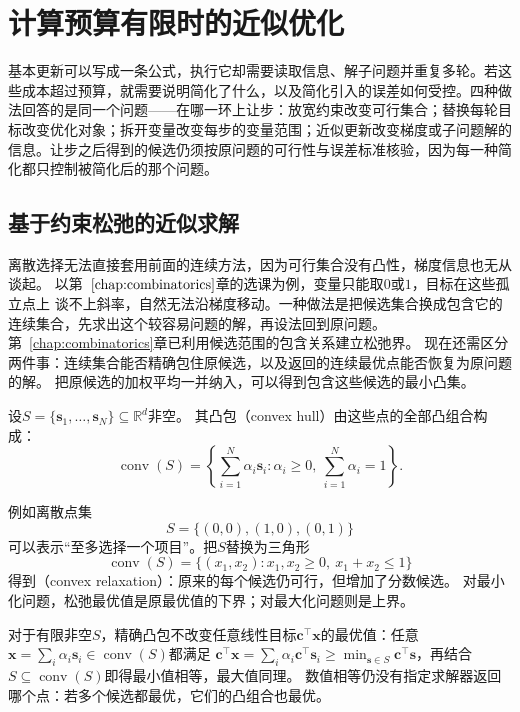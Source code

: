 \section{计算预算有限时的近似优化}
\label{sec:opt-approximate-optimization}

基本更新可以写成一条公式，执行它却需要读取信息、解子问题并重复多轮。若这些成本超过预算，就需要说明简化了什么，以及简化引入的误差如何受控。四种做法回答的是同一个问题——在哪一环上让步：放宽约束改变可行集合；替换每轮目标改变优化对象；拆开变量改变每步的变量范围；近似更新改变梯度或子问题解的信息。让步之后得到的候选仍须按原问题的可行性与误差标准核验，因为每一种简化都只控制被简化后的那个问题。

\subsection{基于约束松弛的近似求解}
\label{sec:opt-relaxations-certificates}

离散选择无法直接套用前面的连续方法，因为可行集合没有凸性，梯度信息也无从谈起。
以第~$\ref{chap:combinatorics}$章的选课为例，变量只能取$0$或$1$，目标在这些孤立点上
谈不上斜率，自然无法沿梯度移动。一种做法是把候选集合换成包含它的连续集合，先求出这个较容易问题的解，再设法回到原问题。
第~\ref{chap:combinatorics}章已利用候选范围的包含关系建立松弛界。
现在还需区分两件事：连续集合能否精确包住原候选，以及返回的连续最优点能否恢复为原问题的解。
把原候选的加权平均一并纳入，可以得到包含这些候选的最小凸集。

\begin{definition}[有限点集的凸包]
\label{def:opt-convex-hull}
设$S=\{\bm s_1,\ldots,\bm s_N\}\subseteq\mathbb R^d$非空。
其凸包（convex hull）由这些点的全部凸组合构成：
\[
  \operatorname{conv}(S)
  =\left\{\sum_{i=1}^N\alpha_i\bm s_i:
  \alpha_i\geq0,\ \sum_{i=1}^N\alpha_i=1\right\}.
\]
\end{definition}
例如离散点集
\[
  S=\{(0,0),(1,0),(0,1)\}
\]
可以表示“至多选择一个项目”。把$S$替换为三角形
\[
  \operatorname{conv}(S)
  =\{(x_1,x_2):x_1,x_2\geq0,\ x_1+x_2\leq1\}
\]
得到（convex relaxation）：原来的每个候选仍可行，但增加了分数候选。
对最小化问题，松弛最优值是原最优值的下界；对最大化问题则是上界。

对于有限非空$S$，精确凸包不改变任意线性目标$\bm{c}^{\top}\bm{x}$的最优值：任意
$\bm{x}=\sum_i\alpha_i\bm{s}_i\in\operatorname{conv}(S)$都满足
$\bm{c}^{\top}\bm{x}=\sum_i\alpha_i\bm{c}^{\top}\bm{s}_i
\geq\min_{\bm{s}\in S}\bm{c}^{\top}\bm{s}$，再结合
$S\subseteq\operatorname{conv}(S)$即得最小值相等，最大值同理。
数值相等仍没有指定求解器返回哪个点：若多个候选都最优，它们的凸组合也最优。

